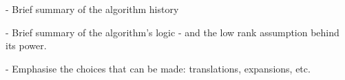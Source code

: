 - Brief summary of the algorithm history

- Brief summary of the algorithm's logic - and the low rank assumption behind its power. 

- Emphasise the choices that can be made: translations, expansions, etc.


